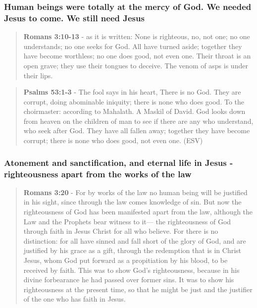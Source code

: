 \documentclass[11pt]{article}
\begin{document}
\subsubsection{Human beings were totally at the mercy of God. We needed Jesus to come. We still need Jesus}
\label{sec:orgdd5d2f2}
\begin{quote}
\textbf{Romans 3:10-13} - as it is written: None is righteous, no, not one; no one understands; no one seeks for God.  All have turned aside; together they have become worthless; no one does good, not even one.  Their throat is an open grave; they use their tongues to deceive. The venom of asps is under their lips.
\end{quote}

\begin{quote}
\textbf{Psalms 53:1-3} -  The fool says in his heart, There is no God.  They are corrupt, doing abominable iniquity; there is none who does good.  To the choirmaster: according to Mahalath.  A Maskil of David.  God looks down from heaven on the children of man to see if there are any who understand, who seek after God.  They have all fallen away; together they have become corrupt; there is none who does good, not even one.  (ESV)
\end{quote}

\subsubsection{Atonement and sanctification, and eternal life in Jesus - righteousness apart from the works of the law}
\label{sec:org3a6153d}
\begin{quote}
\textbf{Romans 3:20} - For by works of the law no human being will be justified in his sight, since through the law comes knowledge of sin.  But now the righteousness of God has been manifested apart from the law, although the Law and the Prophets bear witness to it— the righteousness of God through faith in Jesus Christ for all who believe. For there is no distinction: for all have sinned and fall short of the glory of God, and are justified by his grace as a gift, through the redemption that is in Christ Jesus, whom God put forward as a propitiation by his blood, to be received by faith. This was to show God's righteousness, because in his divine forbearance he had passed over former sins.  It was to show his righteousness at the present time, so that he might be just and the justifier of the one who has faith in Jesus.
\end{quote}
\end{document}
